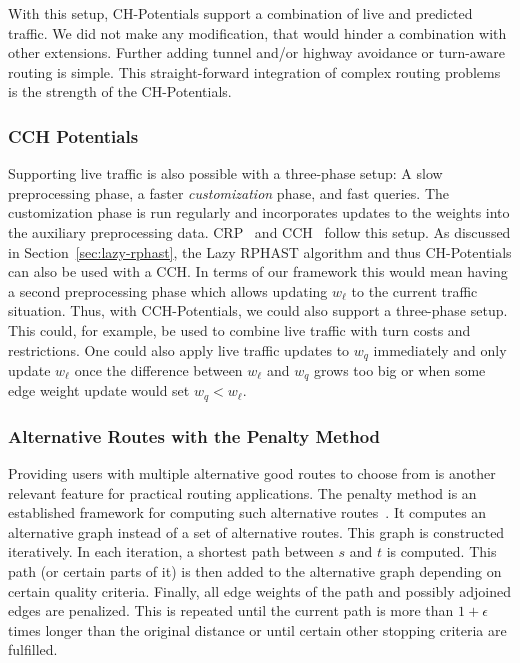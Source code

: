 \documentclass[manuscript,review]{acmart}
\begin{document}
With this setup, CH-Potentials support a combination of live and predicted traffic.
We did not make any modification, that would hinder a combination with other extensions.
Further adding tunnel and/or highway avoidance or turn-aware routing is simple.
This straight-forward integration of complex routing problems is the strength of the CH-Potentials.

\subsubsection{CCH Potentials}

Supporting live traffic is also possible with a three-phase setup:
A slow preprocessing phase, a faster \emph{customization} phase, and fast queries.
The customization phase is run regularly and incorporates updates to the weights into the auxiliary preprocessing data.
CRP~\cite{dgpw-crprn-13} and CCH~\cite{dsw-cch-15} follow this setup.
As discussed in Section~\ref{sec:lazy-rphast}, the Lazy RPHAST algorithm and thus CH-Potentials can also be used with a CCH.
In terms of our framework this would mean having a second preprocessing phase which allows updating $w_\ell$ to the current traffic situation.
Thus, with CCH-Potentials, we could also support a three-phase setup.
This could, for example, be used to combine live traffic with turn costs and restrictions.
One could also apply live traffic updates to $w_q$ immediately and only update $w_\ell$ once the difference between $w_\ell$ and $w_q$ grows too big or when some edge weight update would set $w_q < w_\ell$.

\subsubsection{Alternative Routes with the Penalty Method}

Providing users with multiple alternative good routes to choose from is another relevant feature for practical routing applications.
The penalty method is an established framework for computing such alternative routes~\cite{bdgs-argrn-11,krs-eepma-13,pz-iarp-13,kobitzsch2015alternative}.
It computes an alternative graph instead of a set of alternative routes.
This graph is constructed iteratively.
In each iteration, a shortest path between $s$ and $t$ is computed.
This path (or certain parts of it) is then added to the alternative graph depending on certain quality criteria.
Finally, all edge weights of the path and possibly adjoined edges are penalized.
This is repeated until the current path is more than $1 + \epsilon$ times longer than the original distance or until certain other stopping criteria are fulfilled.
\end{document}
